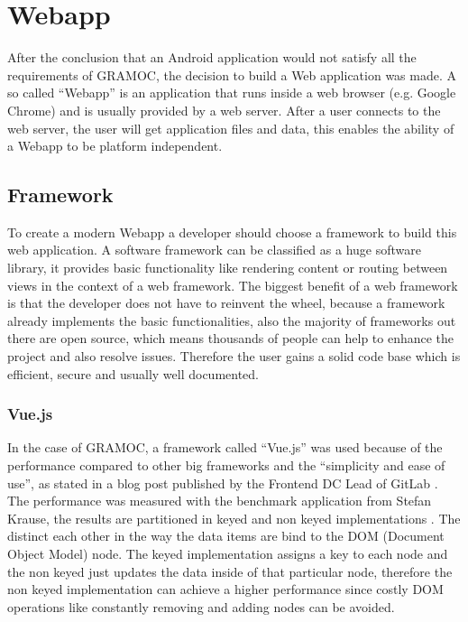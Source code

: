 \chapter{Webapp}
\label{ch:Webapp}

\author{Nico Leidenfrost}

After the conclusion that an Android application would not satisfy all the requirements of GRAMOC, the decision to build a Web application was made. A so called ``Webapp'' is an application that runs inside a web browser (e.g. Google Chrome) and is usually provided by a web server. After a user connects to the web server, the user will get application files and data, this enables the ability of a Webapp to be platform independent.

\section{Framework}
To create a modern Webapp a developer should choose a framework to build this web application. A software framework can be classified as a huge software library, it provides basic functionality like rendering content or routing between views in the context of a web framework. The biggest benefit of a web framework is that the developer does not have to reinvent the wheel, because a framework already implements the basic functionalities, also the majority of frameworks out there are open source, which means thousands of people can help to enhance the project and also resolve issues. Therefore the user gains a solid code base which is efficient, secure and usually well documented.

\subsection{Vue.js}
In the case of GRAMOC, a framework called ``Vue.js'' was used because of the performance compared to other big frameworks and the ``simplicity and ease of use'', as stated in a blog post published by the Frontend DC Lead of GitLab \cite{Vue} \cite{WhyVue} \cite{GitLab}. The performance was measured with the benchmark application from Stefan Krause, the results are partitioned in keyed and non keyed implementations \cite{FrameworkBenchmark}. The distinct each other in the way the data items are bind to the DOM (Document Object Model) node. The keyed implementation assigns a key to each node and the non keyed just updates the data inside of that particular node, therefore the non keyed implementation can achieve a higher performance since costly DOM operations like constantly removing and adding nodes can be avoided.

